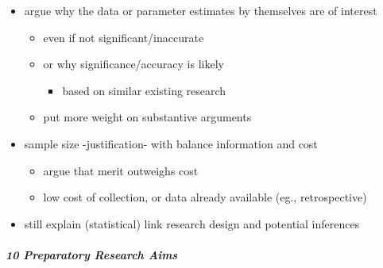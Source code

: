 \documentclass[
]{article}
\providecommand{\tightlist}{%
  \setlength{\itemsep}{0pt}\setlength{\parskip}{0pt}}
\begin{document}
\begin{itemize}
  \begin{itemize}
  \tightlist
  \item
    argue why the data or parameter estimates by themselves are of
    interest

    \begin{itemize}
    \tightlist
    \item
      even if not significant/inaccurate
    \item
      or why significance/accuracy is likely

      \begin{itemize}
      \tightlist
      \item
        based on similar existing research
      \end{itemize}
    \item
      put more weight on substantive arguments
    \end{itemize}
  \item
    sample size -justification- with balance information and cost

    \begin{itemize}
    \tightlist
    \item
      argue that merit outweighs cost
    \item
      low cost of collection, or data already available (eg.,
      retrospective)
    \end{itemize}
  \item
    still explain (statistical) link research design and potential
    inferences
  \end{itemize}
\end{itemize}

\hypertarget{preparatory-research-aims}{%
\subparagraph{10 Preparatory Research
Aims}\label{preparatory-research-aims}}
\end{document}
